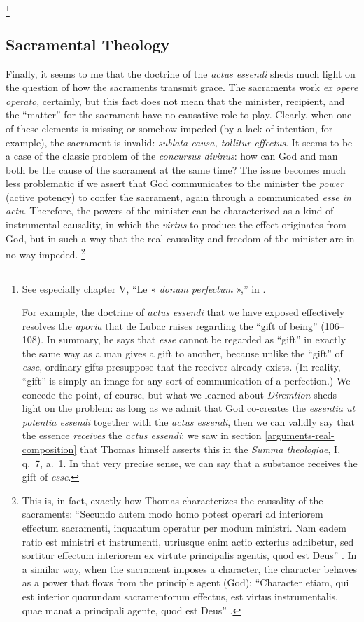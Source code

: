 \footnote{See especially chapter V, “Le « \emph{donum perfectum} »,” in \cite[105–134]{delubac:mystere}%
.

For example, the doctrine of \emph{actus essendi} that we have exposed effectively resolves the \emph{aporia} that de Lubac raises regarding the “gift of being” (106–108). In summary, he says that \emph{esse} cannot be regarded as “gift” in exactly the same way as a man gives a gift to another, because unlike the “gift” of \emph{esse}, ordinary gifts presuppose that the receiver already exists. (In reality, “gift” is simply an image for any sort of communication of a perfection.) We concede the point, of course, but what we learned about \emph{Diremtion} sheds light on the problem: as long as we admit that God co-creates the \emph{essentia ut potentia essendi} together with the \emph{actus essendi}, then we can validly say that the essence \emph{receives} the \emph{actus essendi}; we saw in section \ref{arguments-real-composition} that Thomas himself asserts this in the \emph{Summa theologiae}, I, q.~7, a.~1. In that very precise sense, we can say that a substance receives the gift of \emph{esse}.}
%


\subsection{Sacramental Theology}

Finally, it seems to me that the doctrine of the \emph{actus essendi} sheds much light on the question of how the sacraments transmit grace. The sacraments work \emph{ex opere operato}, certainly, but this fact does not mean that the minister, recipient, and the “matter” for the sacrament have no causative role to play. Clearly, when one of these elements is missing or somehow impeded (by a lack of intention, for example), the sacrament is invalid: \emph{sublata causa, tollitur effectus}. It seems to be a case of the classic problem of the \emph{concursus divinus}: how can God and man both be the cause of the sacrament at the same time? The issue becomes much less problematic if we assert that God communicates to the minister the \emph{power} (active potency) to confer the sacrament, again through a communicated \emph{esse in actu}. Therefore, the powers of the minister can be characterized as a kind of instrumental causality, in which the \emph{virtus} to produce the effect originates from God, but in such a way that the real causality and freedom of the minister are in no way impeded.%
%
\footnote{This is, in fact, exactly how Thomas characterizes the causality of the sacraments: “Secundo autem modo homo potest operari ad interiorem effectum sacramenti, inquantum operatur per modum ministri. Nam eadem ratio est ministri et instrumenti, utriusque enim actio exterius adhibetur, sed sortitur effectum interiorem ex virtute principalis agentis, quod est Deus” \parencite[III, q.~64, a.~1, co.]{st:summa}. In a similar way, when the sacrament imposes a character, the character behaves as a power that flows from the principle agent (God): “Character etiam, qui est interior quorundam sacramentorum effectus, est virtus instrumentalis, quae manat a principali agente, quod est Deus” \parencite[III, q.~64, a.~1, co.]{st:summa}.}
%


